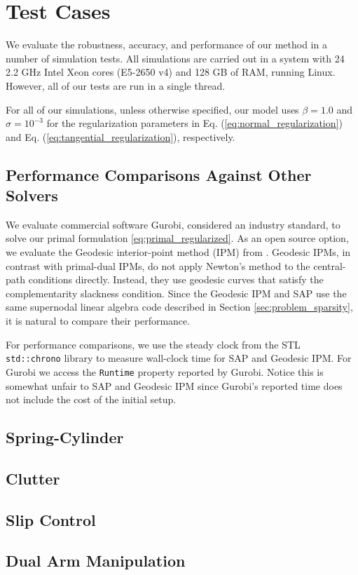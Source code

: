 \section{Test Cases}
\label{sec:test_cases}

We evaluate the robustness, accuracy, and performance of our method in a number
of simulation tests. All simulations are carried out in a system with 24 2.2 GHz
Intel Xeon cores (E5-2650 v4) and 128 GB of RAM, running Linux. However, all of
our tests are run in a single thread.

For all of our simulations, unless otherwise specified, our model uses
$\beta=1.0$ and $\sigma=10^{-3}$ for the regularization parameters in Eq.
(\ref{eq:normal_regularization}) and Eq. (\ref{eq:tangential_regularization}),
respectively.

\subsection{Performance Comparisons Against Other Solvers}
\label{sec:about_solvers}

We evaluate commercial software Gurobi, considered an industry standard, to
solve our primal formulation \eqref{eq:primal_regularized}. As an open source option, we evaluate the Geodesic interior-point method (IPM)
from \cite{bib:permenter2020}. Geodesic IPMs, in contrast with primal-dual
IPMs, do not apply Newton's method to the central-path conditions directly.
Instead, they use geodesic curves that satisfy the complementarity slackness
condition. Since the Geodesic IPM and SAP use the same supernodal linear algebra
code described in Section \ref{sec:problem_sparsity}, it is natural to compare
their performance.

For performance comparisons, we use the steady clock from the STL
\verb+std::chrono+ library to measure wall-clock time for SAP and Geodesic IPM.
For Gurobi we access the \verb+Runtime+ property reported by Gurobi. Notice this
is somewhat unfair to SAP and Geodesic IPM since Gurobi's reported time does not
include the cost of the initial setup.

\subsection{Spring-Cylinder}
\label{sec:spring_cylinder}


\subsection{Clutter}
\label{sec:clutter}


\subsection{Slip Control}
\label{sec:slip_control}


\subsection{Dual Arm Manipulation}
\label{sec:dual_arm}

